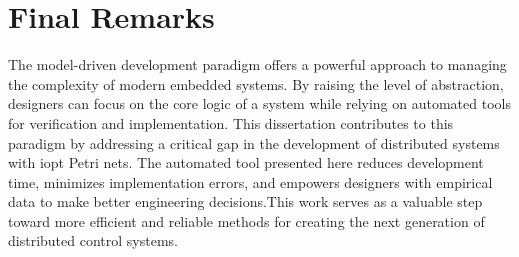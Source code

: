 \section{Final Remarks}
\label{sec:final_remarks}

The model-driven development paradigm offers a powerful approach to managing the complexity of modern embedded systems. By raising the level of abstraction, designers can focus on the core logic of a system while relying on automated tools for verification and implementation. This dissertation contributes to this paradigm by addressing a critical gap in the development of distributed systems with \gls{iopt} Petri nets. The automated tool presented here reduces development time, minimizes implementation errors, and empowers designers with empirical data to make better engineering decisions.This work serves as a valuable step toward more efficient and reliable methods for creating the next generation of distributed control systems.

